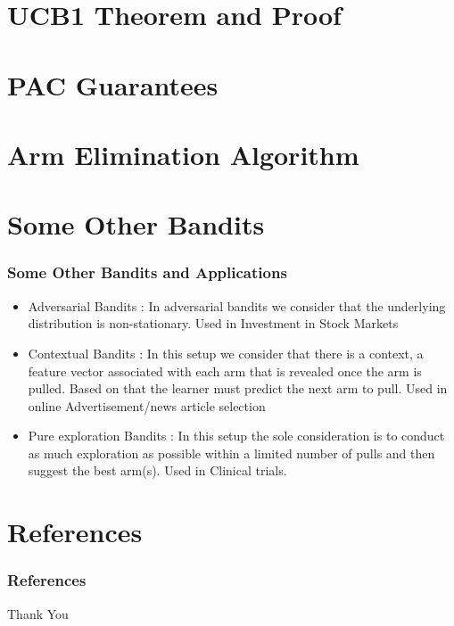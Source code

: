 \documentclass{beamer}
\begin{document}
\section{UCB1 Theorem and Proof}


\section{PAC Guarantees}


\section{Arm Elimination Algorithm}


\section{Some Other Bandits} 
\begin{frame}
\frametitle{Some Other Bandits and Applications}

\begin{itemize}
\item<1-> Adversarial Bandits : In adversarial bandits we consider that the underlying distribution is non-stationary. Used in Investment in Stock Markets
\item<2-> Contextual Bandits : In this setup we consider that there is a context, a feature vector associated with each arm that is revealed once the arm is pulled. Based on that the learner must predict the next arm to pull. Used in online Advertisement/news article selection
\item<3-> Pure exploration Bandits : In this setup the sole consideration is to conduct as much exploration as possible within a limited number of pulls and then suggest the best arm(s). Used in Clinical trials.
\end{itemize}
\end{frame}

\section{References}
\begin{frame}[allowframebreaks]
\frametitle{References}
 

\end{frame}



\begin{frame}
\Huge{\centerline{Thank You}}
\end{frame}

\end{document}
